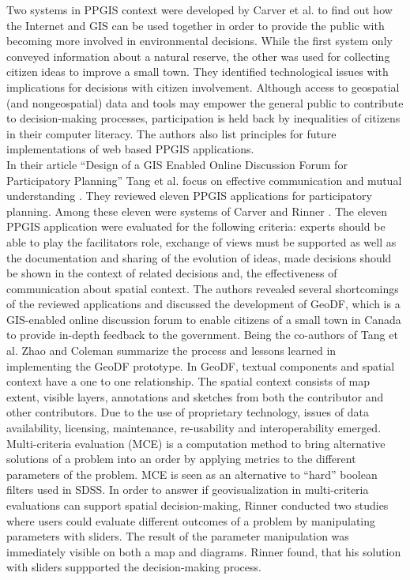 Two systems in PPGIS context were developed by Carver et al. \cite{Carver2001_PPGIS_Cyberdemocracy} to find out how the Internet and GIS can be used together in order to provide the public with becoming more involved in environmental decisions. While the first system only conveyed information about a natural reserve, the other was used for collecting citizen ideas to improve a small town. They identified technological issues with implications for decisions with citizen involvement. Although access to geospatial (and nongeospatial) data and tools may empower the general public to contribute to decision-making processes, participation is held back by inequalities of citizens in their computer literacy. The authors also list principles for future implementations of web based PPGIS applications.\\
In their article ``Design of a GIS Enabled Online Discussion Forum for Participatory Planning'' Tang et al. focus on effective communication and mutual understanding \cite{Tang2005_PPGIS_discussion_forum}. They reviewed eleven PPGIS applications for participatory planning. Among these eleven were systems of Carver \cite{Carver2001_PPGIS_Cyberdemocracy} and Rinner \cite{Rinner_ArgumentationMaps,Kessler2005_ArgumentationMapPrototype}. The eleven PPGIS application were evaluated for the following criteria: experts should be able to play the facilitators role, exchange of views must be supported as well as the documentation and sharing of the evolution of ideas, made decisions should be shown in the context of related decisions and, the effectiveness of communication about spatial context. The authors revealed several shortcomings of the reviewed applications and discussed the development of GeoDF, which is a GIS-enabled online discussion forum to enable citizens of a small town in Canada to provide in-depth feedback to the government. Being the co-authors of Tang et al. \cite{Tang2005_PPGIS_discussion_forum} Zhao and Coleman \cite{zhao2006geodf} summarize the process and lessons learned in implementing the GeoDF prototype. In GeoDF, textual components and spatial context have a one to one relationship. The spatial context consists of map extent, visible layers, annotations and sketches from both the contributor and other contributors. Due to the use of proprietary technology, issues of data availability, licensing, maintenance, re-usability and interoperability emerged.\\
Multi-criteria evaluation (MCE) is a computation method to bring alternative solutions of a problem into an order by applying metrics to the different parameters of the problem. MCE is seen as an alternative to ``hard'' boolean filters used in SDSS. In order to answer if geovisualization in multi-criteria evaluations can support spatial decision-making, Rinner \cite{Rinner2007_geovis_decisionsupport} conducted two studies where users could evaluate different outcomes of a problem by manipulating parameters with sliders. The result of the parameter manipulation was immediately visible on both a map and diagrams. Rinner found, that his solution with sliders suppported the decision-making process.\\
